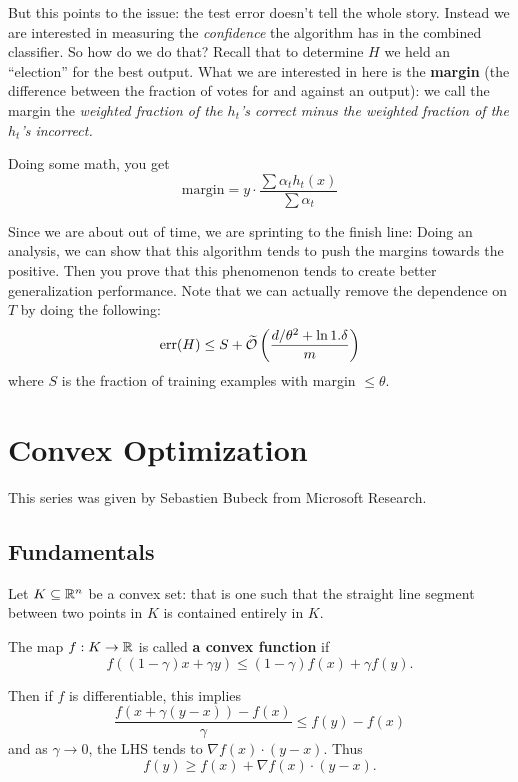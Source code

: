 \documentclass[12pt]{article}
\DeclareMathOperator{\err}{err}
\begin{document}
But this points to the issue: the test error doesn't tell the whole story. Instead we are interested in measuring the \textit{confidence} the algorithm has in the combined classifier. So how do we do that?
Recall that to determine $H$ we held an ``election'' for the best output. What we are interested in here is the \textbf{margin} (the difference between the fraction of votes for and against an output):
we call the margin the \textit{weighted fraction of the $h_t$'s correct minus the weighted fraction of the $h_t$'s incorrect.}

Doing some math, you get 
\[\text{margin}=y\cdot\frac{\sum \alpha_t h_t(x)}{\sum\alpha_t}\]

Since we are about out of time, we are sprinting to the finish line: Doing an analysis, we can show that this algorithm tends to push the margins towards the positive. Then you prove that 
this phenomenon tends to create better generalization performance. Note that we can actually remove the dependence on $T$ by doing the following:
\[\err(H)\le S+\tilde\calO\left(\frac{d/\theta^2+\ln 1.\delta}{m}\right)\]
where $S$ is the fraction of training examples with margin $\le\theta$.



\section{Convex Optimization}
This series was given by Sebastien Bubeck from Microsoft Research.

\subsection{Fundamentals}
Let $K\subseteq \mathbb{R}^n$ be a convex set: that is one such that the straight line segment between two points in $K$ is contained entirely in $K$.
\begin{defn}
	The map $f:K\to\mathbb{R}$ is called \textbf{a convex function} if 
	\[f((1-\gamma)x+\gamma y)\le (1-\gamma)f(x)+\gamma f(y).\]
\end{defn}
\begin{rmk}
	Then if $f$ is differentiable, this implies
	\[\frac{f(x+\gamma(y-x))-f(x)}{\gamma}\le f(y)-f(x)\]
	and as $\gamma\to 0$, the LHS tends to $\nabla f(x)\cdot (y-x)$. Thus
	\[f(y)\ge f(x)+\nabla f(x)\cdot(y-x).\]
\end{rmk}
\end{document}
